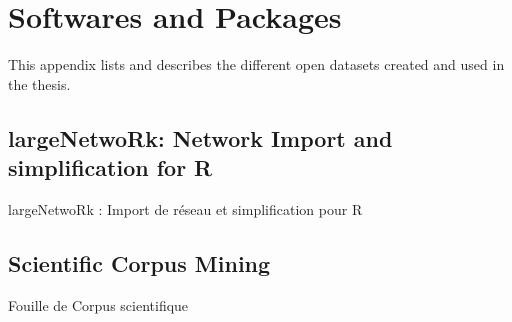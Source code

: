 \chapter{Softwares and Packages} %

\label{app:packages} %



\headercit{}{}{}



This appendix lists and describes the different open datasets created and used in the thesis.


\section{largeNetwoRk: Network Import and simplification for R}{largeNetwoRk : Import de réseau et simplification pour R}



\section{Scientific Corpus Mining}{Fouille de Corpus scientifique}
